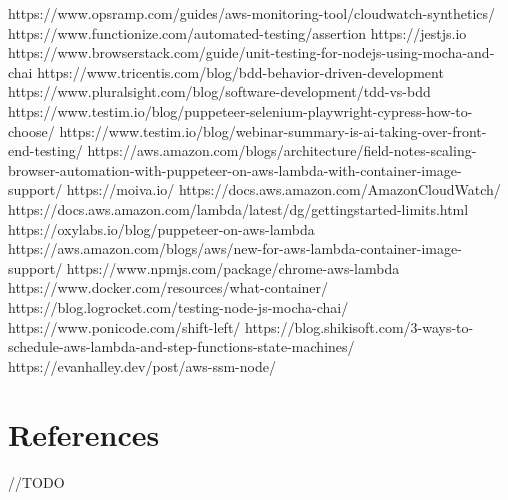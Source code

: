 \documentclass[12pt,a4paper,titlepage]{report}
\begin{document}
https://www.opsramp.com/guides/aws-monitoring-tool/cloudwatch-synthetics/
https://www.functionize.com/automated-testing/assertion
https://jestjs.io
https://www.browserstack.com/guide/unit-testing-for-nodejs-using-mocha-and-chai
https://www.tricentis.com/blog/bdd-behavior-driven-development
https://www.pluralsight.com/blog/software-development/tdd-vs-bdd
https://www.testim.io/blog/puppeteer-selenium-playwright-cypress-how-to-choose/
https://www.testim.io/blog/webinar-summary-is-ai-taking-over-front-end-testing/
https://aws.amazon.com/blogs/architecture/field-notes-scaling-browser-automation-with-puppeteer-on-aws-lambda-with-container-image-support/
https://moiva.io/
https://docs.aws.amazon.com/AmazonCloudWatch/
https://docs.aws.amazon.com/lambda/latest/dg/gettingstarted-limits.html
https://oxylabs.io/blog/puppeteer-on-aws-lambda
https://aws.amazon.com/blogs/aws/new-for-aws-lambda-container-image-support/
https://www.npmjs.com/package/chrome-aws-lambda
https://www.docker.com/resources/what-container/
https://blog.logrocket.com/testing-node-js-mocha-chai/
https://www.ponicode.com/shift-left/
https://blog.shikisoft.com/3-ways-to-schedule-aws-lambda-and-step-functions-state-machines/
https://evanhalley.dev/post/aws-ssm-node/

\chapter{References}
//TODO
\end{document}
